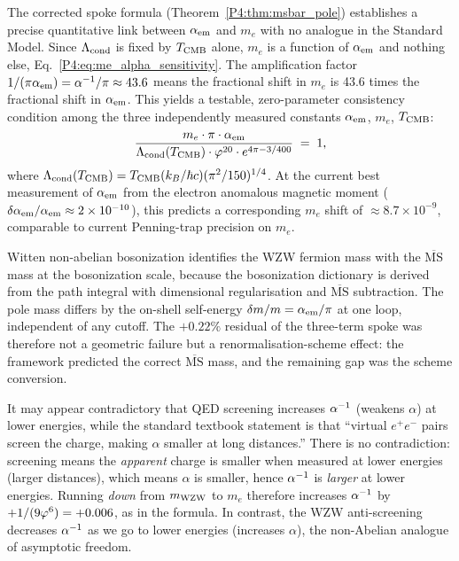 \begin{remark}
\label{P4:rem:alpha_me_tracking}
The corrected spoke formula (Theorem~\ref{P4:thm:msbar_pole}) establishes a
precise quantitative link between $\alpha_{\mathrm{em}}$ and $m_e$ with no analogue in
the Standard Model. Since $\Lambda_{\mathrm{cond}}$ is fixed by $T_{\mathrm{CMB}}$ alone, $m_e$ is a
function of $\alpha_{\mathrm{em}}$ and nothing else, Eq.~\eqref{P4:eq:me_alpha_sensitivity}.
The amplification factor $1/(\pi\alpha_{\mathrm{em}})=\alpha^{-1}/\pi\approx43.6$ means the
fractional shift in $m_e$ is 43.6 times the fractional shift in $\alpha_{\mathrm{em}}$.
This yields a testable, zero-parameter consistency condition among the
three independently measured constants $\alpha_{\mathrm{em}}$, $m_e$, $T_{\mathrm{CMB}}$:
\begin{equation}
  \frac{m_e\cdot\pi\cdot\alpha_{\mathrm{em}}}
       {\Lambda_{\mathrm{cond}}(T_{\mathrm{CMB}})\cdot\varphi^{20}\cdot e^{4\pi-3/400}}
  \;=\; 1,
  \label{P4:eq:consistency_condition}
\end{equation}
where $\Lambda_{\mathrm{cond}}(T_{\mathrm{CMB}}) = T_{\mathrm{CMB}}(k_B/\hbar c)(\pi^2/150)^{1/4}$.  At the current
best measurement of $\alpha_{\mathrm{em}}$ from the electron anomalous magnetic moment
($\delta\alpha_{\mathrm{em}}/\alpha_{\mathrm{em}}\approx2\times10^{-10}$), this predicts a corresponding
$m_e$ shift of $\approx8.7\times10^{-9}$, comparable to current
Penning-trap precision on $m_e$.
\end{remark}

\begin{remark}
\label{P4:rem:msbar_origin}
Witten non-abelian bosonization identifies the WZW fermion mass with the
$\overline{\mathrm{MS}}$ mass at the bosonization scale, because the
bosonization dictionary is derived from the path integral with dimensional
regularisation and $\overline{\mathrm{MS}}$ subtraction. The pole mass
differs by the on-shell self-energy $\delta m/m=\alpha_{\mathrm{em}}/\pi$ at one loop,
independent of any cutoff. The $+0.22\%$ residual of the three-term spoke
was therefore not a geometric failure but a renormalisation-scheme
effect: the framework predicted the correct $\overline{\mathrm{MS}}$ mass,
and the remaining gap was the scheme conversion.
\end{remark}

\begin{remark}
\label{P4:rem:qed_regime_clarification}
It may appear contradictory that QED screening increases $\alpha^{-1}$
(weakens $\alpha$) at lower energies, while the standard textbook statement
is that ``virtual $e^+e^-$ pairs screen the charge, making $\alpha$
smaller at long distances.''  There is no contradiction: screening means
the \emph{apparent} charge is smaller when measured at lower energies
(larger distances), which means $\alpha$ is smaller, hence $\alpha^{-1}$ is
\emph{larger} at lower energies.  Running \emph{down} from $m_{\mathrm{WZW}}$ to $m_e$
therefore increases $\alpha^{-1}$ by $+1/(9\varphi^6) = +0.006$, as in the formula.
In contrast, the WZW anti-screening decreases $\alpha^{-1}$ as we go to lower
energies (increases $\alpha$), the non-Abelian analogue of asymptotic
freedom.
\end{remark}

